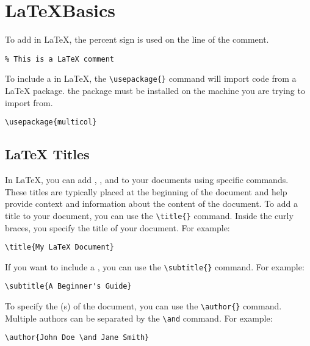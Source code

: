 \section{\LaTeX Basics}

To add  in LaTeX, the percent sign is used on the line of the comment.

\begin{lstlisting}
% This is a LaTeX comment
\end{lstlisting}

To include a  in LaTeX, the \lstinline|\usepackage{}| command will import code from a LaTeX package. the package must be installed on the machine you are trying to import from.
\begin{lstlisting}
\usepackage{multicol}
\end{lstlisting}






\subsection{LaTeX Titles}

In LaTeX, you can add , , and  to your documents using specific commands. These titles are typically placed at the beginning of the document and help provide context and information about the content of the document. To add a title to your document, you can use the \lstinline|\title{}| command. Inside the curly braces, you specify the title of your document. For example:
\begin{lstlisting}
\title{My LaTeX Document}
\end{lstlisting}

If you want to include a , you can use the \lstinline|\subtitle{}| command. For example:
\begin{lstlisting}
\subtitle{A Beginner's Guide}
\end{lstlisting}

To specify the (s) of the document, you can use the \lstinline|\author{}| command. Multiple authors can be separated by the \lstinline|\and| command. For example:
\begin{lstlisting}
\author{John Doe \and Jane Smith}
\end{lstlisting}

